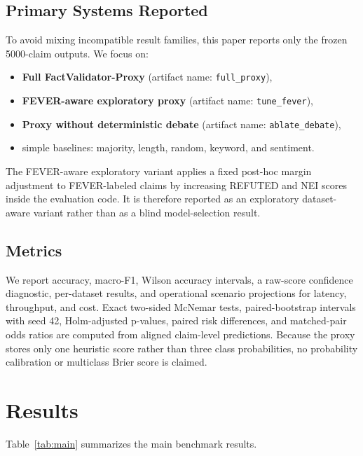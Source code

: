 \documentclass[conference]{IEEEtran}
\begin{document}
\subsection{Primary Systems Reported}

To avoid mixing incompatible result families, this paper reports only the frozen 5000-claim outputs. We focus on:

\begin{itemize}
  \item \textbf{Full FactValidator-Proxy} (artifact name: \texttt{full\_proxy}),
  \item \textbf{FEVER-aware exploratory proxy} (artifact name: \texttt{tune\_fever}),
  \item \textbf{Proxy without deterministic debate} (artifact name: \texttt{ablate\_debate}),
  \item simple baselines: majority, length, random, keyword, and sentiment.
\end{itemize}

The FEVER-aware exploratory variant applies a fixed post-hoc margin adjustment to FEVER-labeled claims by increasing REFUTED and NEI scores inside the evaluation code. It is therefore reported as an exploratory dataset-aware variant rather than as a blind model-selection result.

\subsection{Metrics}

We report accuracy, macro-F1, Wilson accuracy intervals, a raw-score confidence diagnostic, per-dataset results, and operational scenario projections for latency, throughput, and cost. Exact two-sided McNemar tests, paired-bootstrap intervals with seed 42, Holm-adjusted p-values, paired risk differences, and matched-pair odds ratios are computed from aligned claim-level predictions. Because the proxy stores only one heuristic score rather than three class probabilities, no probability calibration or multiclass Brier score is claimed.

\section{Results}

Table~\ref{tab:main} summarizes the main benchmark results.
\end{document}

